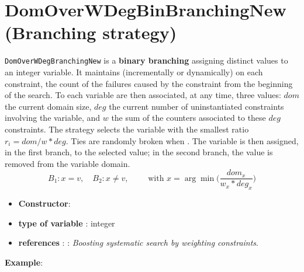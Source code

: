 \section{DomOverWDegBinBranchingNew (Branching strategy)}\label{domoverwdegbin:domoverwdegbinbranchstrat}\hypertarget{domoverwdegbin:domoverwdegbinbranchstrat}{}
\begin{notedef}
  \texttt{DomOverWDegBranchingNew} is a \textbf{binary branching} assigning distinct values to an integer variable. It maintains (incrementally or dynamically) on each constraint, the count of the failures caused by the constraint from the beginning of the search.
To each variable are then associated, at any time, three values: $dom$ the current domain size, $deg$ the current number of uninstantiated constraints involving the variable, and $w$ the sum of the counters associated to these $deg$ constraints.
The strategy selects the variable with the smallest ratio $r_i=dom/w*deg$.  Ties are randomly broken when .
The variable is then assigned, in the first branch, to the selected value; in the second branch, the value is removed from the variable domain.
$$B_1: x=v,\quad B_2: x\neq v,\qquad\text{ with } x=\arg\min\bigl(\frac{dom_x}{w_x*deg_x}\bigr)$$\end{notedef}

\begin{itemize}
	\item \textbf{Constructor}: 
	\item \textbf{type of variable} : integer
	\item \textbf{references} : \cite{Boussemart04}: \emph{Boosting systematic search by weighting constraints}.
\end{itemize}

\textbf{Example}:
%

